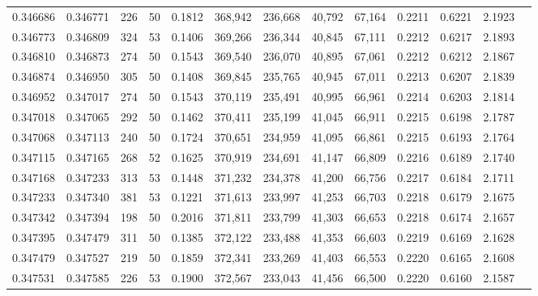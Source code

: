 \begin{tabular}{rrrrrrrrrrrrr}
0.346686 & 0.346771 &   226 &  50 &                                     0.1812 & 368,942 & 236,668 &  40,792 &  67,164 & 0.2211 & 0.6221 & 2.1923 \\
0.346773 & 0.346809 &   324 &  53 &                                     0.1406 & 369,266 & 236,344 &  40,845 &  67,111 & 0.2212 & 0.6217 & 2.1893 \\
0.346810 & 0.346873 &   274 &  50 &                                     0.1543 & 369,540 & 236,070 &  40,895 &  67,061 & 0.2212 & 0.6212 & 2.1867 \\
0.346874 & 0.346950 &   305 &  50 &                                     0.1408 & 369,845 & 235,765 &  40,945 &  67,011 & 0.2213 & 0.6207 & 2.1839 \\
0.346952 & 0.347017 &   274 &  50 &                                     0.1543 & 370,119 & 235,491 &  40,995 &  66,961 & 0.2214 & 0.6203 & 2.1814 \\
0.347018 & 0.347065 &   292 &  50 &                                     0.1462 & 370,411 & 235,199 &  41,045 &  66,911 & 0.2215 & 0.6198 & 2.1787 \\
0.347068 & 0.347113 &   240 &  50 &                                     0.1724 & 370,651 & 234,959 &  41,095 &  66,861 & 0.2215 & 0.6193 & 2.1764 \\
0.347115 & 0.347165 &   268 &  52 &                                     0.1625 & 370,919 & 234,691 &  41,147 &  66,809 & 0.2216 & 0.6189 & 2.1740 \\
0.347168 & 0.347233 &   313 &  53 &                                     0.1448 & 371,232 & 234,378 &  41,200 &  66,756 & 0.2217 & 0.6184 & 2.1711 \\
0.347233 & 0.347340 &   381 &  53 &                                     0.1221 & 371,613 & 233,997 &  41,253 &  66,703 & 0.2218 & 0.6179 & 2.1675 \\
0.347342 & 0.347394 &   198 &  50 &                                     0.2016 & 371,811 & 233,799 &  41,303 &  66,653 & 0.2218 & 0.6174 & 2.1657 \\
0.347395 & 0.347479 &   311 &  50 &                                     0.1385 & 372,122 & 233,488 &  41,353 &  66,603 & 0.2219 & 0.6169 & 2.1628 \\
0.347479 & 0.347527 &   219 &  50 &                                     0.1859 & 372,341 & 233,269 &  41,403 &  66,553 & 0.2220 & 0.6165 & 2.1608 \\
0.347531 & 0.347585 &   226 &  53 &                                     0.1900 & 372,567 & 233,043 &  41,456 &  66,500 & 0.2220 & 0.6160 & 2.1587 \\

\end{tabular}
